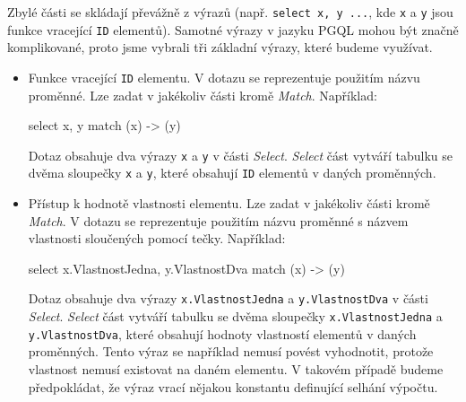 Zbylé části se skládají převážně z výrazů (např. \texttt{select x, y ...}, kde \texttt{x} a \texttt{y} jsou funkce vracející \texttt{ID} elementů).
Samotné výrazy v jazyku PGQL mohou být značně komplikované, proto jsme vybrali tři základní výrazy, které budeme využívat.
\begin{itemize}

\item Funkce vracející \texttt{ID} elementu. 
V dotazu se reprezentuje použitím názvu proměnné.
Lze zadat v jakékoliv části kromě \textit{Match}.
Například:
\begin{code}
select x, y match (x) -> (y)
\end{code}
Dotaz obsahuje dva výrazy \texttt{x} a \texttt{y} v části \textit{Select}.
\textit{Select} část vytváří tabulku se dvěma sloupečky \texttt{x} a \texttt{y}, které obsahují \texttt{ID} elementů v daných proměnných.

\item 
Přístup k hodnotě vlastnosti elementu.
Lze zadat v jakékoliv části kromě \textit{Match}.
V dotazu se reprezentuje použitím názvu proměnné s názvem vlastnosti sloučených pomocí tečky.
Například: 
\begin{code}
select x.VlastnostJedna, y.VlastnostDva match (x) -> (y)
\end{code}
Dotaz obsahuje dva výrazy \texttt{x.VlastnostJedna} a \texttt{y.VlastnostDva} v části \textit{Select}.
\textit{Select} část vytváří tabulku se dvěma sloupečky \texttt{x.VlastnostJedna} a \texttt{y.VlastnostDva}, které obsahují hodnoty vlastností elementů v daných proměnných.
Tento výraz se například nemusí povést vyhodnotit, protože vlastnost nemusí existovat na daném elementu.
V takovém případě budeme předpokládat, že výraz vrací nějakou konstantu definující selhání výpočtu.


\end{itemize}
